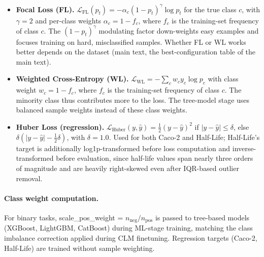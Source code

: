 \documentclass[9pt,a4paper]{article}
\begin{document}
\begin{itemize}[leftmargin=2em]
\item \textbf{Focal Loss (FL).}
  $\mathcal{L}_\text{FL}(p_t) = -\alpha_c (1 - p_t)^\gamma \log p_t$
  for the true class $c$, with $\gamma = 2$ and per-class weights $\alpha_c = 1 - f_c$, where $f_c$ is the training-set frequency of class $c$.
  The $(1 - p_t)^\gamma$ modulating factor down-weights easy examples and focuses
  training on hard, misclassified samples. Whether FL or WL works better depends on the dataset (main text, the best-configuration table of the main text).

\item \textbf{Weighted Cross-Entropy (WL).}
  $\mathcal{L}_\text{WL} = -\sum_c w_c y_c \log p_c$
  with class weight $w_c = 1 - f_c$, where $f_c$ is the training-set frequency of class $c$.
  The minority class thus contributes more to the loss. The tree-model stage uses balanced sample weights instead of these class weights.

\item \textbf{Huber Loss (regression).}
  $\mathcal{L}_\text{Huber}(y,\hat y) = \tfrac{1}{2}(y-\hat y)^2$ if $|y-\hat y|\le\delta$,
  else $\delta(|y-\hat y|-\tfrac12\delta)$, with $\delta=1.0$. Used for both Caco-2
  and Half-Life; Half-Life's target is additionally log1p-transformed before loss
  computation and inverse-transformed before evaluation, since half-life values
  span nearly three orders of magnitude and are heavily right-skewed even after
  IQR-based outlier removal.
\end{itemize}

\paragraph{Class weight computation.}
For binary tasks, scale\_pos\_weight = $n_\text{neg} / n_\text{pos}$ is passed to
tree-based models (XGBoost, LightGBM, CatBoost) during ML-stage training,
matching the class imbalance correction applied during CLM finetuning. Regression
targets (Caco-2, Half-Life) are trained without sample weighting.
\end{document}
